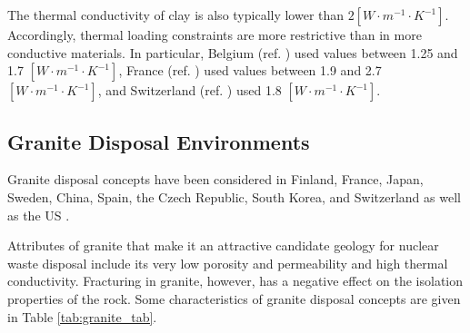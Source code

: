 The thermal conductivity of clay is also typically lower than 
$2[W\cdot m^{-1} \cdot K^{-1}]$. 
Accordingly, thermal loading constraints are more restrictive than in more 
conductive materials. 
In particular, Belgium (ref. 
\cite{ondraf-niras_technical_2001}) 
used values between 1.25 and 1.7 $[W\cdot m^{-1}\cdot K^{-1}]$,
France (ref. \cite{andra_argile:_2005}) used values between 1.9 and 2.7 
$[W\cdot m^{-1}\cdot K^{-1}]$, and Switzerland (ref. 
\cite{johnson_calculations_2002}) used 1.8 $[W\cdot m^{-1}\cdot K^{-1}]$.



\subsection{Granite Disposal Environments}

Granite disposal concepts have been considered in Finland, France, Japan, 
Sweden, China,  Spain, the Czech Republic, South Korea, and Switzerland 
\cite{andra_granite:_2005, von_lensa_red-impact_2008} as well as the \gls{US} 
\cite{hardin_generic_2011}.

Attributes of granite that make it an attractive candidate geology for nuclear 
waste disposal include its very low porosity and permeability and high thermal 
conductivity. Fracturing in granite, however, has a negative effect on the 
isolation properties of the rock.
Some characteristics of granite disposal 
concepts are given in Table \ref{tab:granite_tab}.   

